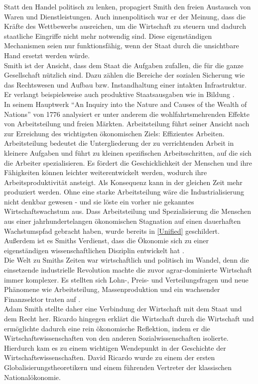 %
Statt den Handel politisch zu lenken, propagiert Smith den freien Austausch von Waren und Dienstleistungen. Auch innenpolitisch war er der Meinung, dass die Kräfte des Wettbewerbs ausreichen, um die Wirtschaft zu steuern und dadurch staatliche Eingriffe nicht mehr notwendig sind. Diese eigenständigen Mechanismen seien nur funktionsfähig, wenn der Staat durch die unsichtbare Hand ersetzt werden würde. \\
%
Smith ist der Ansicht, dass dem Staat die Aufgaben zufallen, die für die ganze Gesellschaft nützlich sind. Dazu zählen die Bereiche der sozialen Sicherung wie das Rechtswesen und Aufbau bzw. Instandhaltung einer intakten Infrastruktur. Er verlangt beispielsweise auch produktive Staatsausgaben wie in Bildung \cite[S. 39-40]{Huther.2006}. \\
%
In seinem Hauptwerk "`An Inquiry into the Nature and Causes of the Wealth of Nations"' von 1776 analysiert er unter anderem die wohlfahrtsmehrenden Effekte von Arbeitsteilung und freien Märkten. Arbeitsteilung führt seiner Ansicht nach zur Erreichung des wichtig\-sten ökonomischen Ziels: Effizientes Arbeiten. Arbeitsteilung bedeutet die Untergliederung der zu verrichtenden Arbeit in kleinere Aufgaben und führt zu kleinen spezifischen Arbeitsschritten, auf die sich die Arbeiter spezialisieren. Es fördert die Geschicklichkeit der Menschen und ihre Fähigkeiten können leichter weiterentwickelt werden, wodurch ihre Arbeitsproduktivität ansteigt. Als Konsequenz kann in der gleichen Zeit mehr produziert werden. Ohne eine starke Arbeitsteilung wäre die Industrialisierung nicht denkbar gewesen - und sie löste ein vorher nie gekanntes Wirtschaftswachstum aus. Dass Arbeitsteilung und Spezialisierung die Menschen aus einer jahrhundertelangen ökonomischen Stagnation auf einen dauerhaften Wachstumspfad gebracht haben, wurde bereits in \ref{Unified} geschildert.\\
%
Außerdem ist es Smiths Verdienst, dass die Ökonomie sich zu einer eigenständigen wissenschaftlichen Disziplin entwickelt hat \cite{Lin.2007,Huther.2006}. \\
%
Die Welt zu Smiths Zeiten war wirtschaftlich und politisch im Wandel, denn die einsetzende industrielle Revolution machte die zuvor agrar-dominierte Wirtschaft immer komplexer. Es stellten sich Lohn-, Preis- und Verteilungsfragen und neue Phänomene wie Arbeitsteilung, Massenproduktion und ein wachsender Finanzsektor traten auf \cite[S. 41-42]{Huther.2006}.\\
%
Adam Smith stellte daher eine Verbindung der Wirtschaft mit dem Staat und dem Recht her. Ricardo hingegen erklärt die Wirtschaft durch die Wirtschaft und ermöglichte dadurch eine rein ökonomische Reflektion, indem er die Wirtschaftswissenschaften von den anderen Sozialwissenschaften isolierte. Hierdurch kam es zu einem wichtigen Wendepunkt in der Geschichte der Wirtschaftswissenschaften. David Ricardo wurde zu einem der ersten Globalisierungstheoretikern und einem führenden Vertreter der klassischen Nationalökonomie. \\
